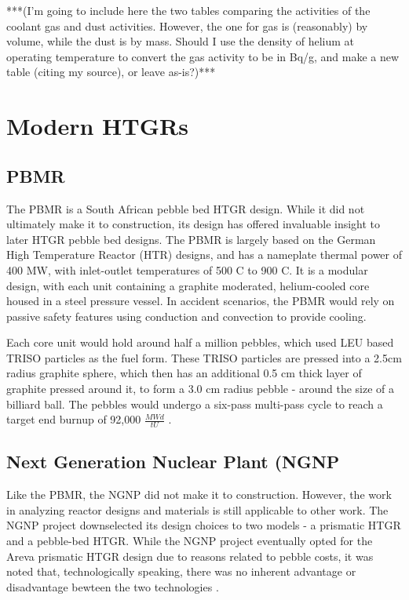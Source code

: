 ***(I'm going to include here the two tables comparing the activities of the coolant gas and dust activities.  However, the one for gas is (reasonably) by volume, while the dust is by mass.  Should I use the density of helium at operating temperature to convert the gas activity to be in Bq/g, and make a new table (citing my source), or leave as-is?)***





\section{Modern HTGRs}

\subsection{PBMR}

The PBMR is a South African pebble bed HTGR design.  While it did not ultimately make it to construction, its design has offered invaluable insight to later HTGR pebble bed designs.  The PBMR is largely based on the German High Temperature Reactor (HTR) designs, and has a nameplate thermal power of 400 MW, with inlet-outlet temperatures of 500 \textdegree C to 900 \textdegree C.  It is a modular design, with each unit containing a graphite moderated, helium-cooled core housed in a steel pressure vessel.  In accident scenarios, the PBMR would rely on passive safety features using conduction and convection to provide cooling.



Each core unit would hold around half a million pebbles, which used LEU based TRISO particles as the fuel form.  These TRISO particles are pressed into a 2.5cm radius graphite sphere, which then has an additional 0.5 cm thick layer of graphite pressed around it, to form a 3.0 cm radius pebble - around the size of a billiard ball.  The pebbles would undergo a six-pass multi-pass cycle to reach a target end burnup of 92,000 $\frac{MWd}{tU}$ \cite{venter_pbmr_2005}. 

\subsection{Next Generation Nuclear Plant (NGNP}

Like the PBMR, the NGNP did not make it to construction.  However, the work in analyzing reactor designs and materials is still applicable to other work.  The NGNP project downselected its design choices to two models - a prismatic HTGR and a pebble-bed HTGR.  While the NGNP project eventually opted for the Areva prismatic HTGR design \cite{noauthor_areva_nodate} due to reasons related to pebble costs, it was noted that, technologically speaking, there was no inherent advantage or disadvantage bewteen the two technologies \cite{inl_basis_2011}.

